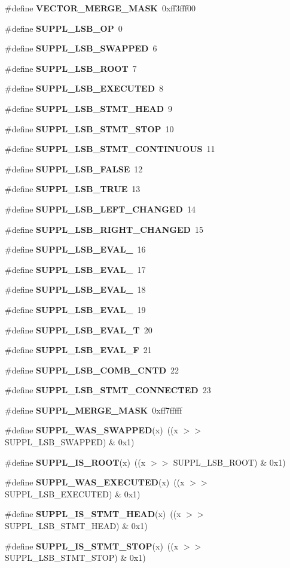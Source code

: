 \begin{CompactItemize}
\item 
\#define {\bf VECTOR\_\-MERGE\_\-MASK}\ 0xff3fff00
\item 
\#define {\bf SUPPL\_\-LSB\_\-OP}\ 0
\item 
\#define {\bf SUPPL\_\-LSB\_\-SWAPPED}\ 6
\item 
\#define {\bf SUPPL\_\-LSB\_\-ROOT}\ 7
\item 
\#define {\bf SUPPL\_\-LSB\_\-EXECUTED}\ 8
\item 
\#define {\bf SUPPL\_\-LSB\_\-STMT\_\-HEAD}\ 9
\item 
\#define {\bf SUPPL\_\-LSB\_\-STMT\_\-STOP}\ 10
\item 
\#define {\bf SUPPL\_\-LSB\_\-STMT\_\-CONTINUOUS}\ 11
\item 
\#define {\bf SUPPL\_\-LSB\_\-FALSE}\ 12
\item 
\#define {\bf SUPPL\_\-LSB\_\-TRUE}\ 13
\item 
\#define {\bf SUPPL\_\-LSB\_\-LEFT\_\-CHANGED}\ 14
\item 
\#define {\bf SUPPL\_\-LSB\_\-RIGHT\_\-CHANGED}\ 15
\item 
\#define {\bf SUPPL\_\-LSB\_\-EVAL\_}\ 16
\item 
\#define {\bf SUPPL\_\-LSB\_\-EVAL\_}\ 17
\item 
\#define {\bf SUPPL\_\-LSB\_\-EVAL\_}\ 18
\item 
\#define {\bf SUPPL\_\-LSB\_\-EVAL\_}\ 19
\item 
\#define {\bf SUPPL\_\-LSB\_\-EVAL\_\-T}\ 20
\item 
\#define {\bf SUPPL\_\-LSB\_\-EVAL\_\-F}\ 21
\item 
\#define {\bf SUPPL\_\-LSB\_\-COMB\_\-CNTD}\ 22
\item 
\#define {\bf SUPPL\_\-LSB\_\-STMT\_\-CONNECTED}\ 23
\item 
\#define {\bf SUPPL\_\-MERGE\_\-MASK}\ 0xff7fffff
\item 
\#define {\bf SUPPL\_\-WAS\_\-SWAPPED}(x)\ ((x $>$$>$ SUPPL\_\-LSB\_\-SWAPPED) \& 0x1)
\item 
\#define {\bf SUPPL\_\-IS\_\-ROOT}(x)\ ((x $>$$>$ SUPPL\_\-LSB\_\-ROOT) \& 0x1)
\item 
\#define {\bf SUPPL\_\-WAS\_\-EXECUTED}(x)\ ((x $>$$>$ SUPPL\_\-LSB\_\-EXECUTED) \& 0x1)
\item 
\#define {\bf SUPPL\_\-IS\_\-STMT\_\-HEAD}(x)\ ((x $>$$>$ SUPPL\_\-LSB\_\-STMT\_\-HEAD) \& 0x1)
\item 
\#define {\bf SUPPL\_\-IS\_\-STMT\_\-STOP}(x)\ ((x $>$$>$ SUPPL\_\-LSB\_\-STMT\_\-STOP) \& 0x1)
$$
\end{CompactItemize}

